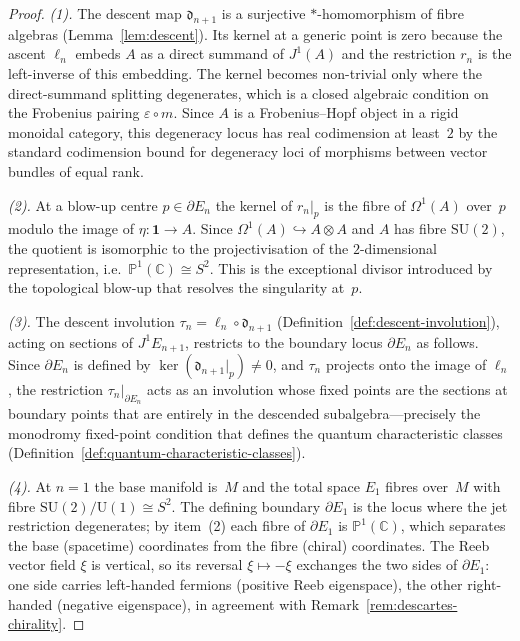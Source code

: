 \begin{proof}
\emph{(1).}\; The descent map $\mathfrak{d}_{n+1}$ is a surjective
$*$-homomorphism of fibre algebras (Lemma~\ref{lem:descent}).  Its kernel at a
generic point is zero because the ascent $\ell_n$ embeds $A$ as a direct
summand of $J^1(A)$ and the restriction $r_n$ is the left-inverse of this
embedding.  The kernel becomes non-trivial only where the direct-summand
splitting degenerates, which is a closed algebraic condition on the
Frobenius pairing $\varepsilon \circ m$.  Since $A$ is a Frobenius--Hopf
object in a rigid monoidal category, this degeneracy locus has real
codimension at least~$2$ by the standard codimension bound for degeneracy loci
of morphisms between vector bundles of equal rank.

\emph{(2).}\; At a blow-up centre $p \in \partial E_n$ the kernel of
$r_n|_p$ is the fibre of $\Omega^1(A)$ over~$p$ modulo the image of
$\eta\colon \mathbf{1} \to A$.  Since
$\Omega^1(A) \hookrightarrow A \otimes A$ and $A$ has fibre
$\mathrm{SU}(2)$, the quotient is isomorphic to the projectivisation of
the $2$-dimensional representation, i.e.\
$\mathbb{P}^1(\mathbb{C}) \cong S^2$.  This is the exceptional divisor introduced
by the topological blow-up that resolves the singularity at~$p$.

\emph{(3).}\; The descent involution $\tau_n = \ell_n \circ \mathfrak{d}_{n+1}$
(Definition~\ref{def:descent-involution}), acting on sections of
$J^1 E_{n+1}$, restricts to the boundary locus $\partial E_n$ as follows.
Since $\partial E_n$ is defined by $\ker(\mathfrak{d}_{n+1}|_p) \neq 0$,
and $\tau_n$ projects onto the image of $\ell_n$, the restriction
$\tau_n|_{\partial E_n}$ acts as an involution whose fixed points are
the sections at boundary points that are entirely in the descended
subalgebra---precisely the monodromy fixed-point condition that
defines the quantum characteristic classes
(Definition~\ref{def:quantum-characteristic-classes}).

\emph{(4).}\; At $n = 1$ the base manifold is~$M$ and the total space
$E_1$ fibres over~$M$ with fibre $\mathrm{SU}(2)/\mathrm{U}(1) \cong S^2$.
The defining boundary $\partial E_1$ is the locus where the jet
restriction degenerates; by item~(2) each fibre of $\partial E_1$ is
$\mathbb{P}^1(\mathbb{C})$, which separates the base (spacetime) coordinates from the
fibre (chiral) coordinates.  The Reeb vector field $\xi$ is vertical, so
its reversal $\xi \mapsto -\xi$ exchanges the two sides of $\partial E_1$:
one side carries left-handed fermions (positive Reeb eigenspace), the other
right-handed (negative eigenspace), in agreement with
Remark~\ref{rem:descartes-chirality}.
\end{proof}

